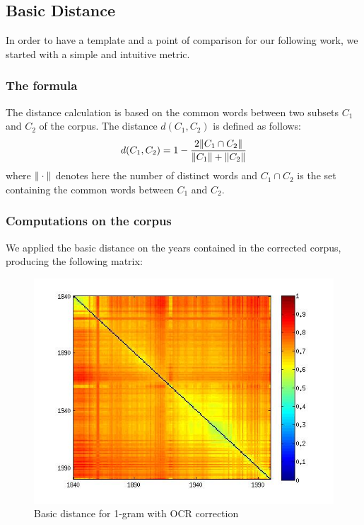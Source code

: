 \subsection{Basic Distance}

In order to have a template and a point of comparison for our following work, we started with a simple and intuitive metric.

\subsubsection{The formula}

The distance calculation is based on the common words between two subsets $C_1$ and $C_2$ of the corpus. The distance $d(C_1,C_2)$ is defined as follows:
\begin{eqnarray}
 d(C_1,C_2) = 1 - \frac{2 \Arrowvert C_1 \cap C_2\Arrowvert}{\Arrowvert C_1 \Arrowvert + \Arrowvert C_2 \Arrowvert }
\end{eqnarray}
where $\Arrowvert \cdot \Arrowvert$ denotes here the number of distinct words and $C_1 \cap C_2$ is the set containing the common words between $C_1$ and $C_2$.

\subsubsection{Computations on the corpus}

We applied the basic distance on the years contained in the corrected corpus, producing the following matrix:

\begin{figure}[H]
    \centering
    \includegraphics[scale=0.4]{Pictures/distance1/d1.jpg}
    \caption{Basic distance for 1-gram with OCR correction}
    \label{D1}
\end{figure}

